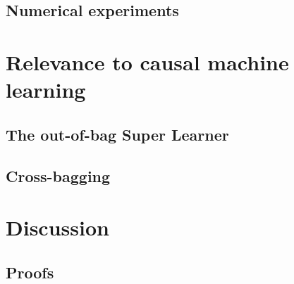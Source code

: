 \documentclass[ejsv2]{imsart}
\theoremstyle{plain}
\theoremstyle{definition}
\theoremstyle{remark}
\begin{document}
\subsection{Numerical experiments}

\section{Relevance to causal machine learning}

\subsection{The out-of-bag Super Learner}

\subsection{Cross-bagging}

\section{Discussion}

\begin{appendix}
\section*{Proofs}\label{appn:proofs} %
\end{appendix}

\begin{acks}[Acknowledgments]
\end{acks}

\begin{funding}
\end{funding}
\end{document}
